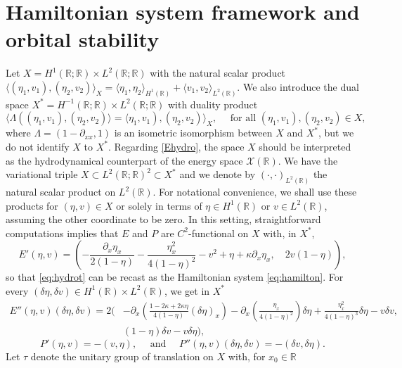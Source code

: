 \documentclass[11pt]{article}
\newcommand{\R}{\mathbb{R}}
\theoremstyle{plain}
\theoremstyle{definition}
\theoremstyle{remark}
\numberwithin{equation}{section}
\begin{document}
{	\section{Hamiltonian system framework and orbital stability}\label{sec:hamilton}
	Let $X= H^1(\R;\R)\times  L^2(\R;\R)$ with the natural scalar product $\langle(\eta_1,v_1),(\eta_2,v_2)\rangle_X=\langle\eta_1,\eta_2\rangle_{ H^1(\R)}+\langle v_1,v_2\rangle_{ L^2(\R)}$. We also introduce the dual space $X^*= H^{{-1}}(\R;\R)\times  L^2(\R;\R)$ with duality product $$\langle\Lambda((\eta_1,v_1),(\eta_2,v_2)\rangle=\langle\eta_1,v_1),(\eta_2,v_2)\rangle_X,\quad\text{ for all }(\eta_1,v_1),(\eta_2,v_2)\in X,$$
	where $\Lambda=(1-\partial_{xx},1)$ is an isometric isomorphism between $X$ and $X^*$, but we do not identify $X$ to $X^*$. Regarding \eqref{Ehydro}, the space $X$ should be interpreted as the hydrodynamical counterpart of the energy space $\mathcal{X}(\R)$. 
	We have the variational triple $X\subset L^2(\R;\R)^2\subset X^*$ and we denote by $(\cdot,\cdot)_{ L^2(\R)}$ the natural scalar product on $ L^2(\R)$. For notational convenience, we shall use these products for $(\eta,v)\in X$ or solely in terms of $\eta\in H^1(\R)$ or $v\in L^2(\R)$, assuming the other coordinate to be zero. %
	In this setting, straightforward computations implies that $E$ and $P$ are $ C^2$-functional on $X$ with, in $X^*$,
	\begin{equation}\label{eq:Eprim}
		E'(\eta,v)=\left(-\frac{\partial_{x}\eta_x}{2(1-\eta)}-\frac{\eta_x^2}{4(1-\eta)^2}-v^2+\eta+\kappa\partial_{x}\eta_x,\quad2v(1-\eta)\right),
	\end{equation}
	so that \eqref{eq:hydrot} can be recast as the Hamiltonian system \eqref{eq:hamilton}.
	For every $(\delta\eta,\delta v)\in  H^1(\R)\times L^2(\R)$, we get in $X^*$
	\begin{align}\label{eq:Ehess}
		E''(\eta,v)(\delta\eta,\delta v)=2\Big(&	-\partial_x\left(\frac{1-2\kappa+2\kappa\eta}{4(1-\eta)}(\delta\eta)_x\right)-
		\partial_x\left(\frac{\eta_x}{4(1-\eta)^2}\right)\delta\eta+\frac{\eta_x^2}{4(1-\eta)^3}\delta\eta-v\delta v,\\
			&(1-\eta)\delta v-v\delta\eta\Big),
	\end{align}
	\begin{equation}\label{eq:pprim}
		P'(\eta,v)=-(v,\eta),\quad\text{ and }\quad P''(\eta,v)(\delta\eta,\delta v)=-(\delta v,\delta\eta).
	\end{equation}
	Let $\tau$ denote the unitary group of translation on $X$ with, for $x_0\in\R$
}
\end{document}
